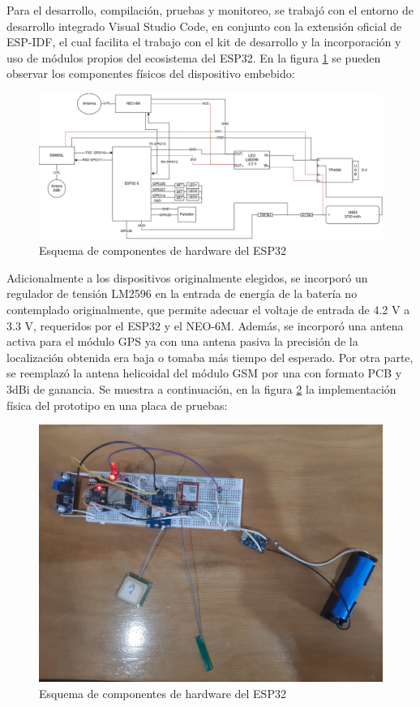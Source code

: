 Para el desarrollo, compilación, pruebas y monitoreo, se trabajó con el entorno de desarrollo integrado Visual Studio Code, en conjunto con la extensión oficial de ESP-IDF, el cual facilita el trabajo con el kit de desarrollo y la incorporación y uso de módulos propios del ecosistema del ESP32. En la figura \ref{fig:esp32:diagrama} se pueden observar los componentes físicos del dispositivo embebido:


\begin{figure}[H]
	\centering
	\includegraphics[width=1\textwidth]{./Figures/esp32-arquitectura.png}
	\caption{Esquema de componentes de hardware del ESP32}
	\label{fig:esp32:diagrama}
\end{figure}

Adicionalmente a los dispositivos originalmente elegidos, se incorporó un regulador de tensión LM2596 en la entrada de energía de la batería no contemplado originalmente, que permite adecuar el voltaje de entrada de 4.2 V a 3.3 V\citep{LM2596:1}, requeridos por el ESP32 y el NEO-6M. Además, se incorporó una antena activa para el módulo GPS ya con una antena pasiva la precisión de la localización obtenida era baja o tomaba más tiempo del esperado. Por otra parte, se reemplazó la antena helicoidal del módulo GSM por una con formato PCB y 3dBi de ganancia. Se muestra a continuación, en la figura \ref{fig:esp32:fisico} la implementación física del prototipo en una placa de pruebas:

\begin{figure}[H]
	\centering
	\includegraphics[width=1\textwidth]{./Figures/esp32-fisico.jpg}
	\caption{Esquema de componentes de hardware del ESP32}
	\label{fig:esp32:fisico}
\end{figure}


